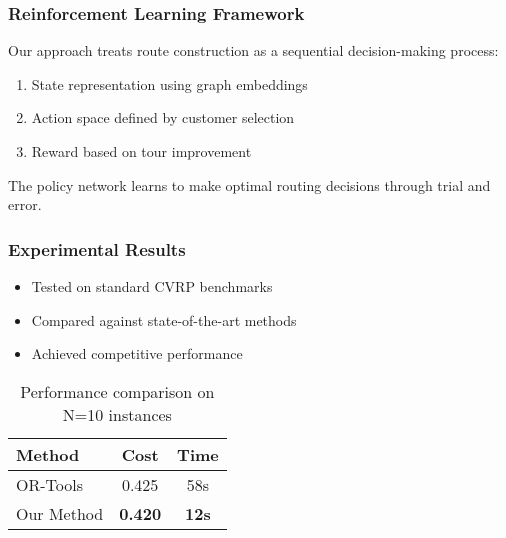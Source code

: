 \documentclass[aspectratio=169]{beamer}
\begin{document}
\begin{frame}
    \frametitle{Reinforcement Learning Framework}
    
    Our approach treats route construction as a sequential decision-making process:
    
    \begin{enumerate}
        \item State representation using graph embeddings
        \item Action space defined by customer selection
        \item Reward based on tour improvement
    \end{enumerate}
    
    The policy network learns to make optimal routing decisions through trial and error.
    
    
\end{frame}

\begin{frame}
    \frametitle{Experimental Results}
    
    \begin{itemize}
        \item Tested on standard CVRP benchmarks
        \item Compared against state-of-the-art methods
        \item Achieved competitive performance
    \end{itemize}
    
    \begin{table}[h]
        \centering
        \small
        \begin{tabular}{|l|c|c|}
        \hline
        \textbf{Method} & \textbf{Cost} & \textbf{Time} \\
        \hline
        OR-Tools & 0.425 & 58s \\
        Our Method & \textbf{0.420} & \textbf{12s} \\
        \hline
        \end{tabular}
        \caption{Performance comparison on N=10 instances}
    \end{table}
    
    
\end{frame}
\end{document}
